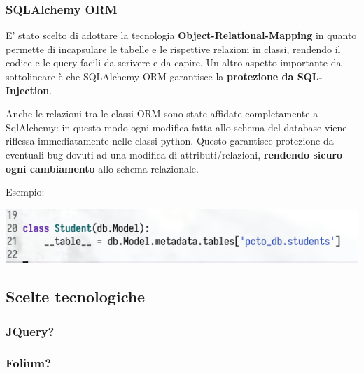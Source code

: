 \documentclass[11pt]{article}
\begin{document}
\subsubsection{SQLAlchemy ORM}
\label{sec:orgb6066d3}

E' stato scelto di adottare la tecnologia \textbf{Object-Relational-Mapping} in quanto permette di incapsulare le tabelle e le rispettive relazioni in classi, rendendo il codice e le query facili da scrivere e da capire. Un altro aspetto importante da sottolineare è che SQLAlchemy ORM garantisce la \textbf{protezione da SQL-Injection}.

Anche le relazioni tra le classi ORM sono state affidate completamente a SqlAlchemy: in questo modo ogni modifica fatta allo schema del database viene riflessa immediatamente nelle classi python. Questo garantisce protezione da eventuali bug dovuti ad una modifica di attributi/relazioni, \textbf{rendendo sicuro ogni cambiamento} allo schema relazionale.

Esempio:

\begin{center}
\includegraphics[width=.9\linewidth]{./resources/orm.png}
\end{center}

\subsection{Scelte tecnologiche}
\label{sec:org8ddb3fe}

\subsubsection{JQuery?}
\label{sec:orgbe822ac}

\subsubsection{Folium?}
\label{sec:org9c3e58a}
\end{document}
